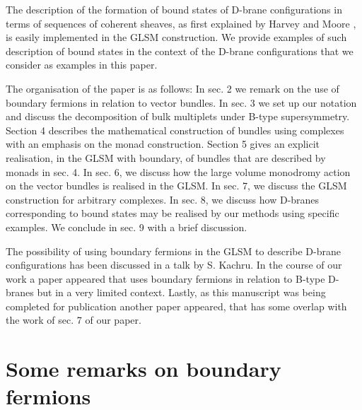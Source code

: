 \documentclass[a4paper,12pt]{article}
\begin{document}
The description of the formation of bound states of D-brane
configurations in terms of sequences of coherent sheaves, 
as first explained by Harvey and Moore \cite{bpsalgebra}, is easily  
implemented in the GLSM construction. We provide examples of such
description of bound states in the context of the D-brane configurations  
that we consider as examples in this paper.


The organisation of the paper is as follows: In sec. 2 we remark on the
use of boundary fermions in relation to vector bundles. In sec. 3  we
set up our notation and discuss the decomposition of bulk multiplets
under B-type supersymmetry.  Section 4 describes the mathematical
construction of bundles using complexes with an emphasis on the monad
construction. Section 5 gives an explicit realisation, in the GLSM with
boundary, of bundles that
are described by monads in sec. 4. In sec. 6, we discuss how the large
volume monodromy action on the vector bundles is realised in the GLSM.
In sec. 7, we discuss the GLSM construction for arbitrary complexes.
In sec. 8, we discuss how D-branes corresponding to bound states
may be realised by our methods using specific examples. We conclude
in sec. 9 with a brief discussion. 

The possibility of using boundary fermions in the GLSM to describe D-brane
configurations has been discussed in a talk by S.
Kachru\cite{stringstalk}. In the course of our work a paper
appeared \cite{hori} that uses boundary fermions in relation 
to B-type D-branes but in a very limited context. Lastly, as this
manuscript was being completed for publication another paper \cite{mcg}
appeared, that has some overlap with the work of sec. 7 of our paper. 

\section{Some remarks on boundary fermions}
\end{document}
